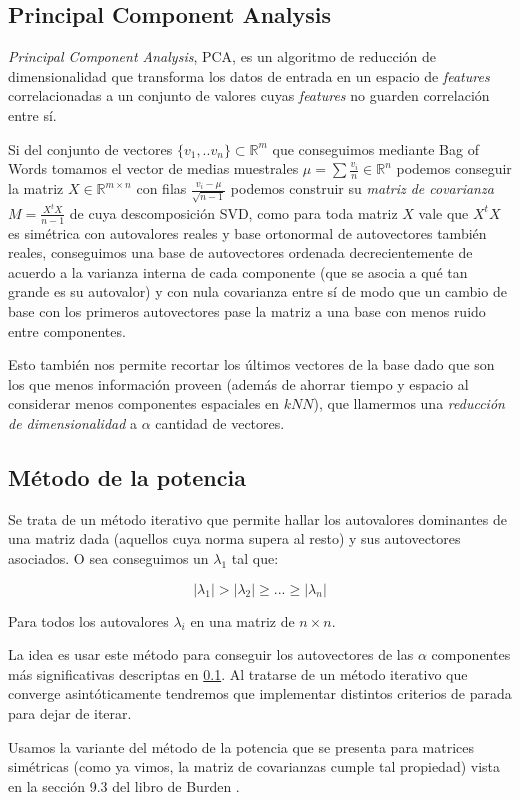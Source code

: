 
\subsection{Principal Component Analysis}%
\label{sub:principal_component_analysis}

\textit{Principal Component Analysis}, PCA, es un algoritmo de reducción de
dimensionalidad que transforma los datos de entrada en un espacio de
\textit{features} correlacionadas a un conjunto de valores cuyas
\textit{features} no guarden correlación entre sí.


Si del conjunto de vectores $\{v_1,..v_n \} \subset \mathds{R}^m$ que
conseguimos mediante Bag of Words tomamos el vector de medias
muestrales $\mu = \sum \frac{v_i}{n} \in \mathds{R}^n $ podemos
conseguir la matriz $X \in \mathds{R}^{m\times n}$ con filas
$\frac{v_i-\mu}{\sqrt{n-1}}$ podemos construir su \textit{matriz de
  covarianza} $M=\frac{X^t X}{n-1}$ de cuya descomposición SVD, como
para toda matriz $X$ vale que $X^t X$ es simétrica con autovalores
reales y base ortonormal de autovectores también reales, conseguimos
una base de autovectores ordenada decrecientemente de acuerdo a la
varianza interna de cada componente (que se asocia a qué tan grande es
su autovalor) y con nula covarianza entre sí de modo que un cambio de
base con los primeros autovectores pase la matriz a una base con menos
ruido entre componentes.

Esto también nos permite recortar los últimos vectores de la base dado
que son los que menos información proveen (además de ahorrar tiempo y
espacio al considerar menos componentes espaciales en $kNN$), que
llamermos una \textit{reducción de dimensionalidad} a $\alpha$
cantidad de vectores.

\subsection{Método de la potencia}%
\label{sub:pm}
Se trata de un método iterativo que permite hallar los autovalores dominantes de
una matriz dada (aquellos cuya norma supera al resto) y sus autovectores
asociados. O sea conseguimos un $\lambda_1$ tal que:

$$ |\lambda_1| > |\lambda_2| \geq ... \geq |\lambda_n| $$

Para todos los autovalores $\lambda_i$ en una matriz de $n\times n$.

La idea es usar este método para conseguir los autovectores de las $\alpha$
componentes más significativas descriptas en \ref{sub:principal_component_analysis}. Al tratarse
de un método iterativo que converge asintóticamente tendremos que implementar distintos criterios de parada para dejar de iterar.

Usamos la variante del método de la potencia que se presenta para matrices simétricas (como ya vimos, la matriz de covarianzas cumple tal propiedad) vista en la sección 9.3 del libro de Burden \cite{Burden}.
